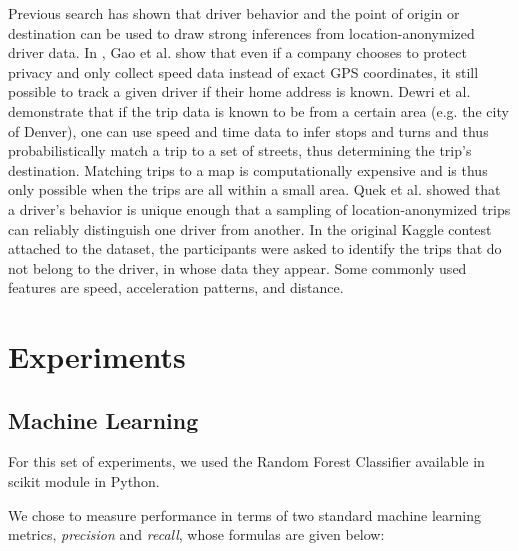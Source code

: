 \documentclass{article}
\begin{document}
Previous search has shown that driver behavior and the point of origin or destination can be used to draw strong inferences from location-anonymized driver data. In \cite{gao2014elastic}, Gao et al. show that even if a company chooses to protect privacy and only collect speed data instead of exact GPS coordinates, it still possible to track a given driver if their home address is known. Dewri et al. demonstrate that if the trip data is known to be from a certain area (e.g. the city of Denver), one can use speed and time data to infer stops and turns and thus probabilistically match a trip to a set of streets, thus determining the trip's destination\cite{dewri2013inferring}. Matching trips to a map is computationally expensive and is thus only possible when the trips are all within a small area.  Quek et al. \cite{quek2013} showed that a driver's behavior is unique enough that a sampling of location-anonymized trips can reliably distinguish one driver from another. In the original Kaggle contest attached to the dataset, the participants were asked to identify the trips that do not belong to the driver, in whose data they appear. Some commonly used features are speed, acceleration patterns, and distance. 





\section{Experiments}

\subsection{Machine Learning}

For this set of experiments, we used the Random Forest Classifier available in scikit module in Python.

We chose to measure performance in terms of two standard machine learning metrics, \emph{precision} and \emph{recall}, whose formulas are given below:
\end{document}
